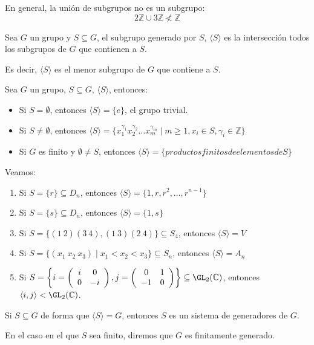 \begin{ejemplo}
    En general, la unión de subgrupos no es un subgrupo:
    \begin{equation*}
        2\mathbb{Z} \cup 3\mathbb{Z}  \not< \mathbb{Z}
    \end{equation*}
\end{ejemplo}

\begin{definicion}
    Sea $G$ un grupo y $S\subseteq G$, el subgrupo generado por $S$, $\langle S \rangle $ es la intersección todos los subgrupos de $G$ que contienen a $S$.

    Es decir, $\langle S \rangle $ es el menor subgrupo de $G$ que contiene a $S$.
\end{definicion}

\begin{prop}
    Sea $G$ un grupo, $S\subseteq G$, $\langle S \rangle $, entonces:
    \begin{itemize}
        \item Si $S = \emptyset $, entonces $\langle S \rangle = \{e\}$, el grupo trivial.
        \item Si $S\neq \emptyset $, entonces $\langle S \rangle = \{x_1^{\gamma_1}x_2^{\gamma_2}\ldots x_m^{\gamma_m} \mid m \geq 1, x_i \in S, \gamma_i \in \mathbb{Z}\}$
        \item Si $G$ es finito y $\emptyset \neq S$, entonces $\langle S \rangle = \{productos finitos de elementos de S\}$
    \end{itemize} %
\end{prop}

\begin{ejemplo}
    Veamos:
    \begin{enumerate}
        \item Si $S= \{r\}\subseteq D_n$, entonces $\langle S \rangle = \{1,r,r^2, \ldots, r^{n-1}\}$
        \item Si $S = \{s\}\subseteq D_n$, entonces $\langle S \rangle = \{1, s\}$
        \item Si $S = \{(1\ 2)(3\ 4), (1\ 3)(2\ 4)\}\subseteq S_4$, entonces $\langle S \rangle = V$
        \item Si $S=\{(x_1\ x_2\ x_3) \mid x_1<x_2<x_3\}\subseteq S_n$, entonces $\langle S \rangle = A_n$
        \item Si $S = \left\{i =\left(\begin{array}{cc}
            i & 0 \\
            0 & -i 
        \end{array}\right), j = \left(\begin{array}{cc}
            0 & 1 \\
            -1 & 0 
        \end{array}\right)\right\}\subseteq \GL_2(\mathbb{C})$, entonces $\langle i,j \rangle < \GL_2(\mathbb{C})$.
    \end{enumerate}
\end{ejemplo}

\begin{prop}
    Si $S\subseteq G$ de forma que $\langle S \rangle =G$, entonces $S$ es un sistema de generadores de $G$.

    En el caso en el que $S$ sea finito, diremos que $G$ es finitamente generado. %
\end{prop}

